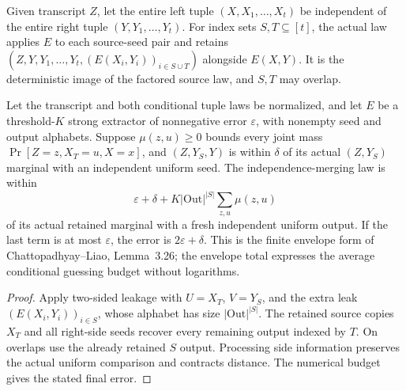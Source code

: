 \begin{definition}
  \label{def:lowerbounds-algebraic-independence-merging}
  \leanok
  Given transcript $Z$, let the entire left tuple
  $(X,X_1,\ldots,X_t)$ be independent of the entire right tuple
  $(Y,Y_1,\ldots,Y_t)$. For index sets $S,T\subseteq[t]$, the actual
  law applies $E$ to each source-seed pair and retains
  $(Z,Y,Y_1,\ldots,Y_t,(E(X_i,Y_i))_{i\in S\cup T})$ alongside
  $E(X,Y)$. It is the deterministic image of the factored source law,
  and $S,T$ may overlap.
\end{definition}

\begin{theorem}
  \label{thm:lowerbounds-algebraic-independence-merging}
  \leanok
  Let the transcript and both conditional tuple laws be normalized, and
  let $E$ be a threshold-$K$ strong extractor of nonnegative error
  $\varepsilon$, with nonempty seed and output alphabets. Suppose
  $\mu(z,u)\ge0$ bounds every joint mass
  $\Pr[Z=z,X_T=u,X=x]$, and $(Z,Y_S,Y)$ is within $\delta$ of its
  actual $(Z,Y_S)$ marginal with an independent uniform seed.
  The independence-merging law is within
  \[
    \varepsilon+\delta+K|\mathrm{Out}|^{|S|}\sum_{z,u}\mu(z,u)
  \]
  of its actual retained marginal with a fresh independent uniform
  output. If the last term is at most $\varepsilon$, the error is
  $2\varepsilon+\delta$. This is the finite envelope form of
  Chattopadhyay--Liao, Lemma~3.26; the envelope total expresses the
  average conditional guessing budget without logarithms.
\end{theorem}
\begin{proof}
  \leanok
  Apply two-sided leakage with $U=X_T$, $V=Y_S$, and the extra leak
  $(E(X_i,Y_i))_{i\in S}$, whose alphabet has size
  $|\mathrm{Out}|^{|S|}$. The retained source copies $X_T$ and all
  right-side seeds recover every remaining output indexed by $T$.
  On overlaps use the already retained $S$ output. Processing side
  information preserves the actual uniform comparison and contracts
  distance. The numerical budget gives the stated final error.
\end{proof}

